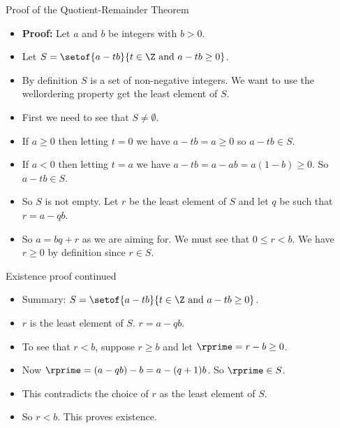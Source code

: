 \documentclass{beamer}
\begin{document}
\begin{frame}{Proof of the Quotient-Remainder Theorem}


\begin{itemize}
  \item \textbf{Proof:} Let $a$ and $b$ be integers with $b>0$.
  \item Let $S = \setof{a-tb}{t\in\Z\text{ and }a-tb\geq 0}$.
  \item By definition $S$ is a set of non-negative integers. We want to use
  the wellordering property get the least element of $S$.
  \item First we need to see that $S\not=\emptyset$.
  \item If $a\geq 0$ then letting $t=0$ we have $a-tb = a \geq 0$ so $a-tb\in S$.
  \item If $a < 0$ then letting $t=a$ we have $a-tb=a-ab = a (1-b) \geq 0$. So $a-tb\in S$.
  \item So $S$ is not empty. Let $r$ be the least element of $S$ and let $q$ be such that $r=a-qb$.
  \item So $a=bq+r$ as we are aiming for. We must see that $0\leq r < b$. We have $r\geq 0$ by definition since $r\in S$.
\end{itemize}

\end{frame}

\begin{frame}{Existence proof continued}


\begin{itemize}
  \item Summary: $S = \setof{a-tb}{t\in\Z\text{ and }a-tb\geq 0}$.
  \item $r$ is the least element of $S$. $r=a-qb$.
  \item To see that $r < b$, suppose $r \geq b$ and let $\rprime = r -b \geq 0$.
  \item Now $\rprime  = (a-qb) -b = a-(q+1)b$. So $\rprime \in S$.
  \item This contradicts the choice of $r$ as the least element of $S$.
  \item So $r < b$. This proves existence.
\end{itemize}

\end{frame}
\end{document}
